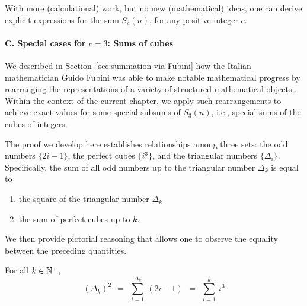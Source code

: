 \medskip

With more (calculational) work, but no new (mathematical) ideas, one
can derive explicit expressions for the sum $S_c(n)$, for any positive integer $c$.

\medskip 

\paragraph{C. Special cases for $c=3$: Sums of cubes}


We described in Section~\ref{sec:summation-via-Fubini} how the Italian mathematician
Guido Fubini was able to make notable mathematical progress by rearranging
the representations of a variety of structured mathematical objects \cite{Fubini}.  Within the 
context of the current chapter, we apply such rearrangements to achieve exact values for some
special subsums of $S_3(n)$, i.e., special sums of the cubes of integers.

The proof we develop here establishes relationships among three sets:
the odd numbers $\{2i-1\}$, the perfect cubes $\{i^3\}$, and the triangular numbers $\{ \Delta_i \}$.
Specifically, the sum of all odd numbers up to the triangular number $\Delta_k$ is equal to
\begin{enumerate}
\item
the square of the triangular number $\Delta_k$
\item
the sum of perfect cubes up to $k$.
\end{enumerate}
We then provide pictorial reasoning that allows one to observe the equality between the preceding quantities.


\begin{prop}
\label{thm:odds-sum2-cubes}
For all $k \in \mathbb{N}^+$,
\begin{equation}
\label{eq:sum-odds=Delta-sq=sum-cubes}
(\Delta_k)^2 \ \  = \ \
\sum_{i=1}^{\Delta_k} \ (2i-1)  \ \ =  \ \ \sum_{i=1}^k \ i^3
\end{equation}
\end{prop}

